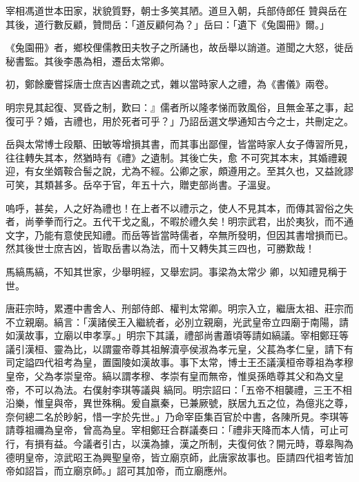 \begin{pinyinscope}
 宰相馮道世本田家，狀貌質野，朝士多笑其陋。道旦入朝，兵部侍郎任
 贊與岳在其後，道行數反顧，贊問岳：「道反顧何為？」岳曰：「遺下《兔園冊》爾。」



 《兔園冊》者，鄉校俚儒教田夫牧子之所誦也，故岳舉以誚道。道聞之大怒，徙岳秘書監。其後李愚為相，遷岳太常卿。



 初，鄭餘慶嘗採唐士庶吉凶書疏之式，雜以當時家人之禮，為《書儀》兩卷。



 明宗見其起復、冥昏之制，歎曰：』儒者所以隆孝悌而敦風俗，且無金革之事，起復可乎？婚，吉禮也，用於死者可乎？」乃詔岳選文學通知古今之士，共刪定之。



 岳與太常博士段顒、田敏等增損其書，而其事出鄙俚，皆當時家人女子傳習所見，往往轉失其本，然猶時有《禮》之遺制。其後亡失，愈
 不可究其本末，其婚禮親迎，有女坐婿鞍合髻之說，尤為不經。公卿之家，頗遵用之。至其久也，又益訛謬可笑，其類甚多。岳卒于官，年五十六，贈吏部尚書。子溫叟。



 嗚呼，甚矣，人之好為禮也！在上者不以禮示之，使人不見其本，而傳其習俗之失者，尚拳拳而行之。五代干戈之亂，不暇於禮久矣！明宗武君，出於夷狄，而不通文字，乃能有意使民知禮。而岳等皆當時儒者，卒無所發明，但因其書增損而已。然其後世士庶吉凶，皆取岳書以為法，而十又轉失其三四也，可勝歎哉！



 馬縞馬縞，不知其世家，少舉明經，又舉宏詞。事梁為太常少
 卿，以知禮見稱于世。



 唐莊宗時，累遷中書舍人、刑部侍郎、權判太常卿。明宗入立，繼唐太祖、莊宗而不立親廟。縞言：「漢諸侯王入繼統者，必別立親廟，光武皇帝立四廟于南陽，請如漢故事，立廟以申孝享。」明宗下其議，禮部尚書蕭頃等請如縞議。宰相鄭玨等議引漢桓、靈為比，以謂靈帝尊其祖解瀆亭侯淑為孝元皇，父萇為孝仁皇，請下有司定謚四代祖考為皇，置園陵如漢故事。事下太常，博士王丕議漢桓帝尊祖為孝穆皇帝，父為孝崇皇帝。縞以謂孝穆、孝崇有皇而無帝，惟吳孫皓尊其父和為文皇帝，不可以為法。右僕射李琪等議與
 縞同。明宗詔曰：「五帝不相襲禮，三王不相沿樂，惟皇與帝，異世殊稱。爰自嬴秦，已兼厥號，朕居九五之位，為億兆之尊，奈何總二名於眇躬，惜一字於先世。」乃命宰臣集百官於中書，各陳所見。李琪等請尊祖禰為皇帝，曾高為皇。宰相鄭玨合群議奏曰：「禮非天降而本人情，可止可行，有損有益。今議者引古，以漢為據，漢之所制，夫復何依？開元時，尊皋陶為德明皇帝，涼武昭王為興聖皇帝，皆立廟京師，此唐家故事也。臣請四代祖考皆加帝如詔旨，而立廟京師。」詔可其加帝，而立廟應州。




\end{pinyinscope}
